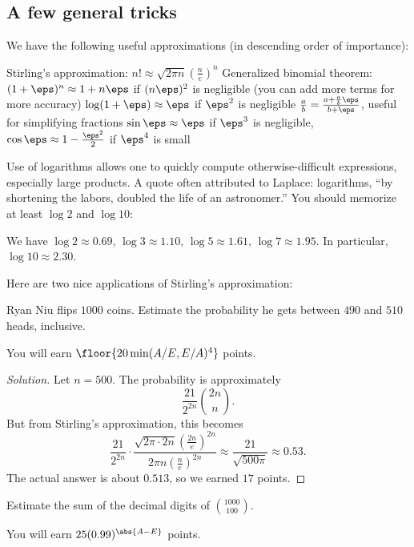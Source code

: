 \documentclass[11pt]{scrartcl}
\renewenvironment{solution}{\renewcommand\qedsymbol{$\blacksquare$}\begin{proof}[Solution]}{\end{proof}}
\begin{document}
\subsection{A few general tricks}

We have the following useful approximations (in descending order of importance):
\begin{itemize}
    \ii Stirling's approximation: $n! \approx \sqrt{2\pi n}(\frac ne)^n$
    \ii Generalized binomial theorem: $(1 + \eps)^n \approx 1 + n\eps$ if $(n\eps)^2$ is negligible (you can add more terms for more accuracy)
    \ii $\log(1 + \eps) \approx \eps$ if $\eps^2$ is negligible
    \ii $\frac ab = \frac{a + \frac ab\eps}{b + \eps}$, useful for simplifying fractions
    \ii $\sin\eps \approx \eps$ if $\eps^3$ is negligible, $\cos\eps \approx 1 - \frac{\eps^2}2$ if $\eps^4$ is small
\end{itemize}

Use of logarithms allows one to quickly compute otherwise-difficult expressions, especially large products. A quote often attributed to Laplace: logarithms, ``by shortening the labors, doubled the life of an astronomer.'' You should memorize at least $\log 2$ and $\log 10$:

\begin{theorem}[Logarithms]
	We have $\log 2 \approx 0.69$, $\log 3 \approx 1.10$, $\log 5 \approx 1.61$, $\log 7 \approx 1.95$. In particular, $\log 10 \approx 2.30$.
\end{theorem}

Here are two nice applications of Stirling's approximation:

\begin{example}
	Ryan Niu flips $1000$ coins. Estimate the probability he gets between $490$ and $510$ heads, inclusive.

	You will earn $\floor{20\min(A/E,E/A)^4}$ points.
\end{example}

\begin{solution}
	Let $n = 500$. The probability is approximately
	\[\frac{21}{2^{2n}}\binom{2n}{n}.\]
	But from Stirling's approximation, this becomes
	\[\frac{21}{2^{2n}} \cdot \frac{\sqrt{2\pi \cdot 2n}(\frac{2n}{e})^{2n}}{2\pi n(\frac ne)^{2n}} \approx \frac{21}{\sqrt{500\pi}} \approx 0.53.\]
	The actual answer is about $0.513$, so we earned $17$ points.
\end{solution}

\begin{example}
	Estimate the sum of the decimal digits of $\binom{1000}{100}$.

	You will earn $25(0.99)^{\abs{A - E}}$ points.
\end{example}
\end{document}
